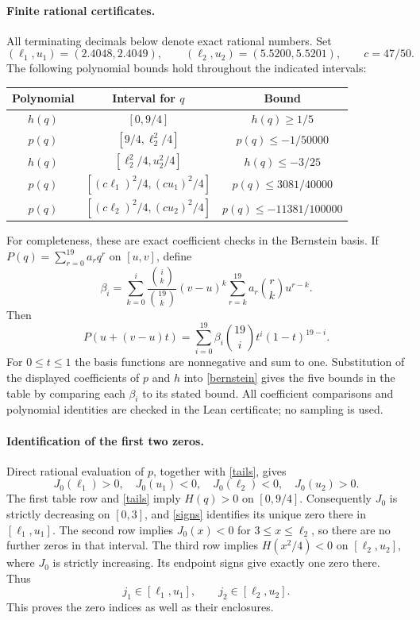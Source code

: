 \documentclass[11pt]{article}
\newcommand{\J}{J_0}
\begin{document}
\paragraph{Finite rational certificates.}
All terminating decimals below denote exact rational numbers. Set
\[
 (\ell_1,u_1)=(2.4048,2.4049),\qquad
 (\ell_2,u_2)=(5.5200,5.5201),\qquad c=47/50.
\]
The following polynomial bounds hold throughout the indicated intervals:
\begin{center}
\begin{tabular}{c|c|c}
Polynomial & Interval for $q$ & Bound\\ \hline
$h(q)$ & $[0,9/4]$ & $h(q)\geq1/5$\\
$p(q)$ & $[9/4,\ell_2^2/4]$ & $p(q)\leq-1/50000$\\
$h(q)$ & $[\ell_2^2/4,u_2^2/4]$ & $h(q)\leq-3/25$\\
$p(q)$ & $[(c\ell_1)^2/4,(cu_1)^2/4]$ & $p(q)\leq3081/40000$\\
$p(q)$ & $[(c\ell_2)^2/4,(cu_2)^2/4]$ & $p(q)\leq-11381/100000$
\end{tabular}
\end{center}
For completeness, these are exact coefficient checks in the Bernstein basis.
If $P(q)=\sum_{r=0}^{19}a_rq^r$ on $[u,v]$, define
\begin{equation}\label{bernstein}
 \beta_i=\sum_{k=0}^{i}\frac{\binom{i}{k}}{\binom{19}{k}}
 (v-u)^k\sum_{r=k}^{19}a_r\binom{r}{k}u^{r-k}.
\end{equation}
Then
\[
 P(u+(v-u)t)=\sum_{i=0}^{19}\beta_i\binom{19}{i}t^i(1-t)^{19-i}.
\]
For $0\leq t\leq1$ the basis functions are nonnegative and sum to one.
Substitution of the displayed coefficients of $p$ and $h$ into
\eqref{bernstein} gives the five bounds in the table by comparing each
$\beta_i$ to its stated bound. All coefficient comparisons and polynomial
identities are checked in the Lean certificate; no sampling is used.

\paragraph{Identification of the first two zeros.}
Direct rational evaluation of $p$, together with \eqref{tails}, gives
\begin{equation}\label{signs}
 \J(\ell_1)>0,\quad \J(u_1)<0,\quad
 \J(\ell_2)<0,\quad \J(u_2)>0.
\end{equation}
The first table row and \eqref{tails} imply $H(q)>0$ on $[0,9/4]$.
Consequently $\J$ is strictly decreasing on $[0,3]$, and \eqref{signs}
identifies its unique zero there in $[\ell_1,u_1]$.
The second row implies $\J(x)<0$ for $3\leq x\leq\ell_2$, so there are
no further zeros in that interval. The third row implies $H(x^2/4)<0$ on
$[\ell_2,u_2]$, where $\J$ is strictly increasing. Its endpoint signs give
exactly one zero there. Thus
\begin{equation}\label{zero-bounds}
 j_1\in[\ell_1,u_1],\qquad j_2\in[\ell_2,u_2].
\end{equation}
This proves the zero indices as well as their enclosures.
\end{document}
